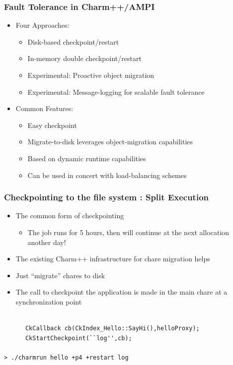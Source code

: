\begin{frame}[fragile]

  \frametitle{Fault Tolerance in Charm++/AMPI}

  \begin{itemize}
    \item Four Approaches:

      \begin{itemize}
\item Disk-based checkpoint/restart
\item In-memory double checkpoint/restart
\item Experimental: Proactive object migration 
\item Experimental: Message-logging for scalable fault tolerance
      \end{itemize}
    \item Common Features:
\begin{itemize}
\item Easy checkpoint 
\item Migrate-to-disk leverages object-migration capabilities
\item Based on dynamic runtime capabilities
\item Can be used in concert with load-balancing schemes
     \end{itemize}
  \end{itemize}
\end{frame}

\begin{frame}[fragile]
  \frametitle{Checkpointing to the file system : Split Execution}
\begin{itemize}
\item The common form of checkpointing
\begin{itemize}
\item The job runs for 5 hours, then will continue at the next
  allocation another day! 
\end{itemize}

\item The existing Charm++ infrastructure for chare migration helps
\item Just ``migrate'' chares to disk
\item The call to checkpoint the application is made in the main chare at a synchronization point
\end{itemize}

 \begin{lstlisting}[basicstyle=\footnotesize]

      CkCallback cb(CkIndex_Hello::SayHi(),helloProxy);
      CkStartCheckpoint(``log'',cb);

> ./charmrun hello +p4 +restart log

\end{lstlisting}

\end{frame}

